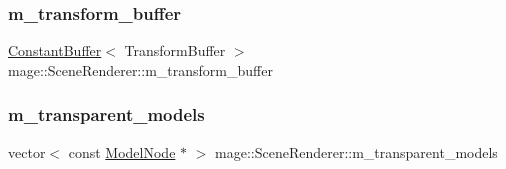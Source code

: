 \hypertarget{classmage_1_1_scene_renderer_a24248f3333316043ffcf662e8557f308}{}\label{classmage_1_1_scene_renderer_a24248f3333316043ffcf662e8557f308} 
\subsubsection{\texorpdfstring{m\+\_\+transform\+\_\+buffer}{m\_transform\_buffer}}
{\footnotesize\ttfamily \hyperlink{structmage_1_1_constant_buffer}{Constant\+Buffer}$<$ Transform\+Buffer $>$ mage\+::\+Scene\+Renderer\+::m\+\_\+transform\+\_\+buffer\hspace{0.3cm}{\ttfamily [private]}}

\hypertarget{classmage_1_1_scene_renderer_abc7a7370f5d824c74449266f170b9d8c}{}\label{classmage_1_1_scene_renderer_abc7a7370f5d824c74449266f170b9d8c} 
\subsubsection{\texorpdfstring{m\+\_\+transparent\+\_\+models}{m\_transparent\_models}}
{\footnotesize\ttfamily vector$<$ const \hyperlink{classmage_1_1_model_node}{Model\+Node} $\ast$ $>$ mage\+::\+Scene\+Renderer\+::m\+\_\+transparent\+\_\+models\hspace{0.3cm}{\ttfamily [private]}}

